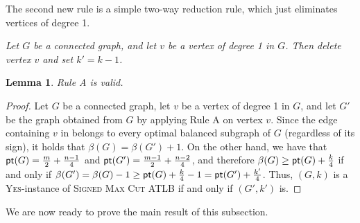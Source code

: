 \documentclass[
final
]{dmtcs-episciences}
\newtheorem{lemma}{Lemma}{\bfseries}{\itshape}
\begin{document}
The second new rule is a simple two-way reduction rule, which just eliminates vertices of degree 1.
\vspace{.25cm}

 {\it{Let $G$ be a connected graph, and let $v$ be a vertex of degree 1 in $G$. Then delete vertex $v$ and set  $k'=k-1$.}}





\begin{lemma}\label{lem:RuleA}
Rule A is valid.
\end{lemma}
\begin{proof} Let $G$ be a connected graph, let $v$ be a vertex of degree 1 in $G$, and let $G'$ be the graph obtained from $G$ by applying Rule A on vertex $v$. Since the edge containing $v$ in belongs to every optimal balanced subgraph of $G$ (regardless of its sign), it holds that $\beta(G) = \beta(G') +1$. On the other hand, we have that ${\sf pt}(G) = \frac{m}{2}+\frac{n-1}{4}$ and ${\sf pt}(G') = \frac{m-1}{2}+\frac{n-2}{4}$, and therefore $\beta(G) \geq {\sf pt}(G) + \frac{k}{4}$ if and only if $\beta(G') = \beta(G) -1 \geq {\sf pt}(G) + \frac{k}{4}  -1 = {\sf pt}(G') + \frac{k'}{4}$. Thus, $(G,k)$ is a \textsc{Yes}-instance of \textsc{Signed Max Cut ATLB} if and only if $(G',k')$ is.
\end{proof}

We are now ready to prove the main result of this subsection.
\end{document}
